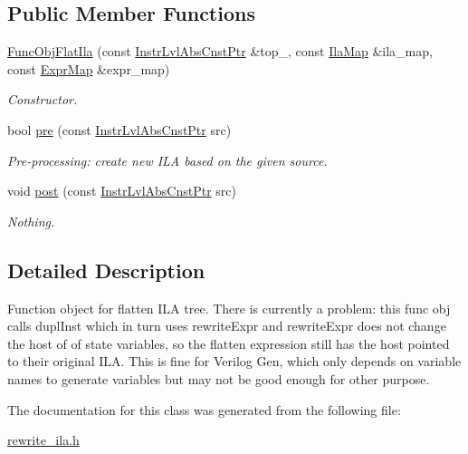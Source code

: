 \subsection*{Public Member Functions}
\begin{DoxyCompactItemize}
\item 
\mbox{\label{classilang_1_1_func_obj_flat_ila_a60ec9f98fefc4521c90860ed8816617d}} 
\mbox{\hyperlink{classilang_1_1_func_obj_flat_ila_a60ec9f98fefc4521c90860ed8816617d}{Func\+Obj\+Flat\+Ila}} (const \mbox{\hyperlink{namespaceilang_adc86156b73aa1a4b6369645e9b96ff19}{Instr\+Lvl\+Abs\+Cnst\+Ptr}} \&top\+\_\+, const \mbox{\hyperlink{classilang_1_1_func_obj_flat_ila_aeb66a3cfe4f928dba4fd5b9996974300}{Ila\+Map}} \&ila\+\_\+map, const \mbox{\hyperlink{namespaceilang_ad40e6475e04844bcad9c380aac0b215c}{Expr\+Map}} \&expr\+\_\+map)
\begin{DoxyCompactList}\small\item\em Constructor. \end{DoxyCompactList}\item 
\mbox{\label{classilang_1_1_func_obj_flat_ila_ac9e5dec0fca543578e27b8572bbff6c8}} 
bool \mbox{\hyperlink{classilang_1_1_func_obj_flat_ila_ac9e5dec0fca543578e27b8572bbff6c8}{pre}} (const \mbox{\hyperlink{namespaceilang_adc86156b73aa1a4b6369645e9b96ff19}{Instr\+Lvl\+Abs\+Cnst\+Ptr}} src)
\begin{DoxyCompactList}\small\item\em Pre-\/processing\+: create new I\+LA based on the given source. \end{DoxyCompactList}\item 
\mbox{\label{classilang_1_1_func_obj_flat_ila_a52b68368bff94b02aba87d0b14cfb539}} 
void \mbox{\hyperlink{classilang_1_1_func_obj_flat_ila_a52b68368bff94b02aba87d0b14cfb539}{post}} (const \mbox{\hyperlink{namespaceilang_adc86156b73aa1a4b6369645e9b96ff19}{Instr\+Lvl\+Abs\+Cnst\+Ptr}} src)
\begin{DoxyCompactList}\small\item\em Nothing. \end{DoxyCompactList}\end{DoxyCompactItemize}


\subsection{Detailed Description}
Function object for flatten I\+LA tree. There is currently a problem\+: this func obj calls dupl\+Inst which in turn uses rewrite\+Expr and rewrite\+Expr does not change the host of of state variables, so the flatten expression still has the host pointed to their original I\+LA. This is fine for Verilog Gen, which only depends on variable names to generate variables but may not be good enough for other purpose. 

The documentation for this class was generated from the following file\+:\begin{DoxyCompactItemize}
\item 
\mbox{\hyperlink{rewrite__ila_8h}{rewrite\+\_\+ila.\+h}}\end{DoxyCompactItemize}

